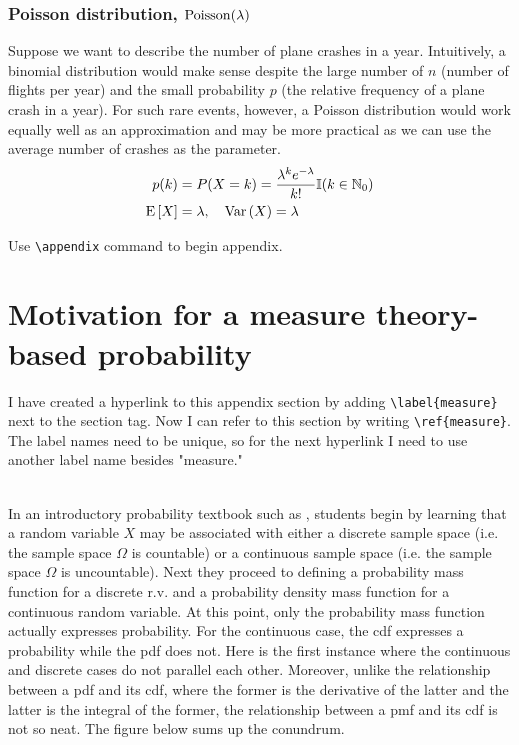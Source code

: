 \documentclass[12pt, notitlepage]{article}
\begin{document}
\subsubsection*{Poisson distribution, $\rm{Poisson}(\lambda)$}
Suppose we want to describe the number of plane crashes in a year. Intuitively, a binomial distribution would make sense despite the large number of $n$ (number of flights per year) and the small probability $p$ (the relative frequency of a plane crash in a year). For such rare events, however, a Poisson distribution would work equally well as an approximation and may be more practical as we can use the average number of crashes as the parameter. 
\begin{align*}
p(k) &= P(X =k) = \dfrac{\lambda^k e^{-\lambda}}{k!}\mathbb{I}(k \in \mathbb{N}_0) \\
\mathrm{E}\,[X] &= \lambda, \quad \mathrm{Var}\,(X) = \lambda
\end{align*}

\newpage 
\appendix 

\begin{notes}
Use \verb|\appendix| command to begin appendix. 
\end{notes}


\section{Motivation for a measure theory-based probability} \label{measure}

\begin{notes}
I have created a hyperlink to this appendix section by adding \verb|\label{measure}| next to the section tag. Now I can refer to this section by writing \verb|\ref{measure}|. The label names need to be unique, so for the next hyperlink I need to use another label name besides "measure."
\end{notes}
\\

In an introductory probability textbook such as \cite{ross}, students begin by learning that a random variable $X$ may be associated with either a discrete sample space (i.e. the sample space $\Omega$ is countable) or a continuous sample space (i.e. the sample space $\Omega$ is uncountable). Next they proceed to defining a probability mass function for a discrete r.v. and a probability density mass function for a continuous random variable. At this point, only the probability mass function actually expresses probability. For the continuous case, the cdf expresses a probability while the pdf does not. Here is the first instance where the continuous and discrete cases do not parallel each other. Moreover, unlike the relationship between a pdf and its cdf, where the former is the derivative of the latter and the latter is the integral of the former, the relationship between a pmf and its cdf is not so neat. The figure below sums up the conundrum.
\end{document}
